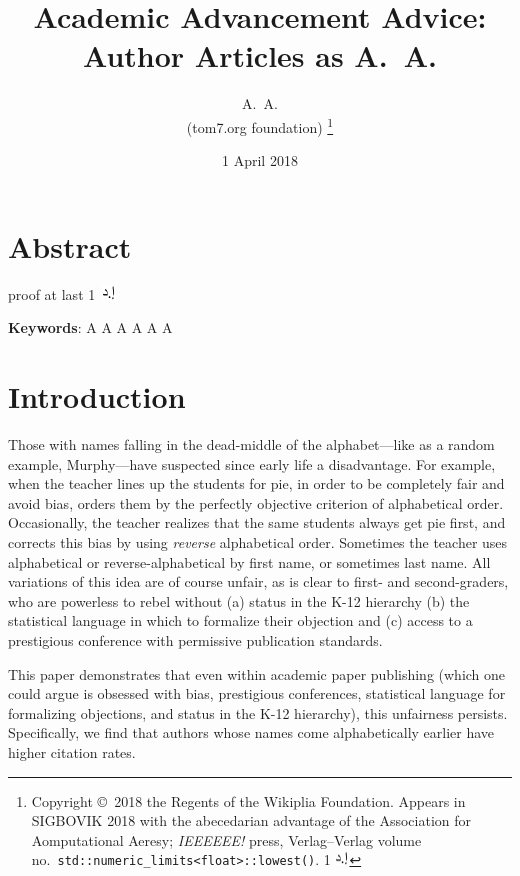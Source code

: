 \documentclass[twocolumn]{article}
\newcommand\dirham{\protect \includegraphics[width=1em]{dirham}}
\begin{document}
 


\title{Academic Advancement Advice: Author Articles as A.~A.}
\author{A.~A. \\
  (tom7.org foundation)
  \thanks{
    Copyright \copyright\ 2018 the Regents of the Wikiplia Foundation.
    Appears in SIGBOVIK 2018 with the abecedarian advantage of the
    Association for Aomputational Aeresy; {\em IEEEEEE!} press,
    Verlag--Verlag volume no.~{\tt std::numeric\_limits<float>::lowest()}.
    1 \dirham
} }

\renewcommand\>{$>$}
\newcommand\<{$<$}

\date{1 April 2018}

\maketitle

\section*{Abstract}
proof at last
    1\ \dirham

\vspace{1em}
{\noindent \small {\bf Keywords}:
  A A A A A A
}

\section{Introduction}

Those with names falling in the dead-middle of the alphabet---like as
a random example, Murphy---have suspected since early life a
disadvantage. For example, when the teacher lines up the students for
pie, in order to be completely fair and avoid bias, orders them by the
perfectly objective criterion of alphabetical order. Occasionally, the
teacher realizes that the same students always get pie first, and
corrects this bias by using {\em reverse} alphabetical order.
Sometimes the teacher uses alphabetical or reverse-alphabetical by
first name, or sometimes last name. All variations of this idea are of
course unfair, as is clear to first- and second-graders, who are
powerless to rebel without (a) status in the K-12 hierarchy (b) the
statistical language in which to formalize their objection and (c)
access to a prestigious conference with permissive publication
standards.

This paper demonstrates that even within academic paper publishing
(which one could argue is obsessed with bias, prestigious conferences,
statistical language for formalizing objections, and status in the
K-12 hierarchy), this unfairness persists. Specifically, we find that
authors whose names come alphabetically earlier have higher citation
rates.
\end{document}
